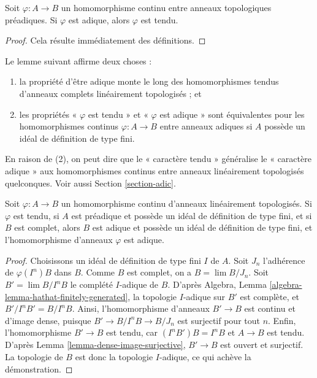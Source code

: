 \begin{lemma}
\label{lemma-adic-taut}
Soit $\varphi : A \to B$ un homomorphisme continu entre anneaux
topologiques préadiques. Si $\varphi$ est adique, alors $\varphi$ est tendu.
\end{lemma}

\begin{proof}
Cela résulte immédiatement des définitions.
\end{proof}

\noindent
Le lemme suivant affirme deux choses :
\begin{enumerate}
\item la propriété d'être adique monte le long des homomorphismes tendus
d'anneaux complets linéairement topologisés ; et
\item les propriétés « $\varphi$ est tendu » et « $\varphi$ est adique »
sont équivalentes pour les homomorphismes continus $\varphi : A \to B$ entre anneaux adiques
si $A$ possède un idéal de définition de type fini.
\end{enumerate}
En raison de (2), on peut dire que le « caractère tendu » généralise le « caractère adique »
aux homomorphismes continus entre anneaux linéairement topologisés quelconques.
Voir aussi Section \ref{section-adic}.

\begin{lemma}
\label{lemma-taut-is-adic}
Soit $\varphi : A \to B$ un homomorphisme continu d'anneaux linéairement topologisés.
Si $\varphi$ est tendu, si $A$ est préadique et possède un idéal de définition
de type fini, et si $B$ est complet, alors $B$ est adique et possède un idéal de définition
de type fini, et l'homomorphisme d'anneaux $\varphi$ est adique.
\end{lemma}

\begin{proof}
Choisissons un idéal de définition de type fini $I$ de $A$.
Soit $J_n$ l'adhérence de $\varphi(I^n)B$ dans $B$.
Comme $B$ est complet, on a $B = \lim B/J_n$.
Soit $B' = \lim B/I^nB$ le complété $I$-adique de $B$.
D'après Algebra, Lemma \ref{algebra-lemma-hathat-finitely-generated},
la topologie $I$-adique sur $B'$ est complète, et
$B'/I^nB' = B/I^nB$. Ainsi, l'homomorphisme d'anneaux $B' \to B$ est continu
et d'image dense, puisque $B' \to B/I^nB \to B/J_n$ est surjectif
pour tout $n$. Enfin, l'homomorphisme $B' \to B$ est tendu,
car $(I^nB')B = I^nB$ et $A \to B$ est tendu.
D'après Lemma \ref{lemma-dense-image-surjective}, $B' \to B$ est ouvert
et surjectif. La topologie de $B$ est donc la topologie $I$-adique,
ce qui achève la démonstration.
\end{proof}








